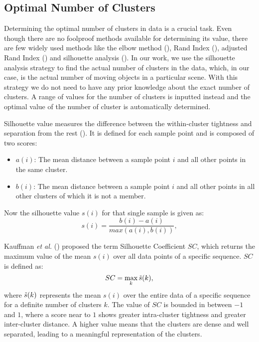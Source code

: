 \documentclass{article}
\begin{document}
\subsection{Optimal Number of Clusters}
Determining the optimal number of clusters in data is a crucial task. Even though there are no foolproof methods available for determining its value, there are few widely used methods like the elbow method (\cite{syakur2018integration}), Rand Index (\cite{santos2009use}), adjusted Rand Index (\cite{hubert1985comparing}) and silhouette analysis (\cite{shutaywi2021silhouette}). In our work, we use the silhouette analysis strategy to find the actual number of clusters in the data, which, in our case, is the actual number of moving objects in a particular scene. With this strategy we do not need to have any prior knowledge about the exact number of clusters. A range of values for the number of clusters is inputted instead and the optimal value of the number of cluster is automatically determined. 

Silhouette value measures the difference between the within-cluster tightness and separation from the rest (\cite{rousseeuw_2002}). It is defined for each sample point and is composed of two scores:
\begin{itemize}[leftmargin=*]
    \itemsep0em
    \item ${a(i)}$: The mean distance between a sample point $i$ and all other points in the same cluster.
    \item ${b(i)}$: The mean distance between a sample point $i$ and all other points in all other clusters of which it is not a member.
\end{itemize}
Now the silhouette value $s(i)$ for that single sample is given as:
\begin{equation} \label{silhouette}
s(i) = \frac{b(i)-a(i)} {max(a(i),b(i))} ,
\end{equation}

Kauffman \textit{et al.} (\cite{kaufman_rousseeuw_1990}) proposed the term Silhouette Coefficient ${SC}$, which returns the maximum value of the mean $s(i)$ over all data points of a specific sequence. ${SC}$ is defined as:
\begin{equation}
    SC = \max_k  \Tilde{s}(k),
\end{equation}
where $\Tilde{s} (k)$ represents the mean $s(i)$ over the entire data of a specific sequence for a definite number of clusters $k$.   
The value of ${SC}$ is bounded in between $-1$ and $1$, where a score near to $1$ shows greater intra-cluster tightness and greater inter-cluster distance. A higher value means that the clusters are dense and well separated, leading to a meaningful representation of the clusters.
\end{document}
